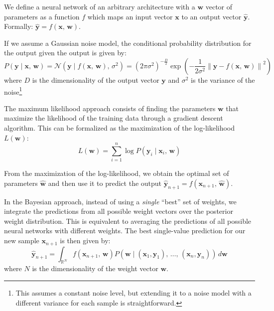 We define a neural network of an arbitrary architecture with a $\textbf{w}$ vector of parameters as a function
$f$ which maps an input vector $\textbf{x}$ to an output vector $\widehat{\textbf{y}}$. Formally: $\widehat{\textbf{y}} = f(\textbf{x},\,\textbf{w})$.

If we assume a Gaussian noise model, the conditional probability distribution for the output given the output is given by:
\begin{equation}
    P(\textbf{y} \mid \textbf{x},\,\textbf{w}) = \mathcal{N}(\textbf{y} \mid f(\textbf{x},\,\textbf{w}),\,\sigma^2)
    = \left(2\pi\sigma^2\right)^{-\frac{D}{2}} \exp \left( -\frac{1}{2\sigma^2} \left\lVert \textbf{y} - f(\textbf{x},\,\textbf{w}) \right\rVert^2 \right)
\end{equation}
where $D$ is the dimensionality of the output vector $\textbf{y}$ and $\sigma^2$ is the variance of the noise\footnote{
    This assumes a constant noise level, but extending it to a noise model with a different variance for each sample is straightforward.
}

The maximum likelihood approach consists of finding the parameters $\textbf{w}$ that maximize the likelihood of the training data
through a gradient descent algorithm. This can be formalized as the maximization of the log-likelihood $L(\textbf{w})$:
\begin{equation}%
    \label{eq:log_likelihood}
    L(\textbf{w}) = \sum_{i=1}^{n} \log P(\textbf{y}_i \mid \textbf{x}_i,\,\textbf{w})
\end{equation}

From the maximization of the log-likelihood, we obtain the optimal set of parameters $\widehat{\textbf{w}}$ and then use it
to predict the output $\widehat{\textbf{y}}_{n+1} = f(\textbf{x}_{n+1},\,\widehat{\textbf{w}})$.

In the Bayesian approach, instead of using a \emph{single} ``best'' set of weights, we integrate the predictions from all possible
weight vectors over the posterior weight distribution. This is equivalent to averaging the predictions of all possible neural networks
with different weights. The best single-value prediction for our new sample $\textbf{x}_{n+1}$ is then given by:
\begin{equation}\label{eq:bnn_single_prediction}
    \widehat{\textbf{y}}_{n+1} = \int_{\mathds{R}^N}
        f(\textbf{x}_{n+1},\,\textbf{w})
        P(\textbf{w} \mid \left(\textbf{x}_1,  \textbf{y}_1 \right),\,\dots,\,\left(\textbf{x}_n,  \textbf{y}_n \right))
        \,d\textbf{w}
\end{equation}
where $N$ is the dimensionality of the weight vector $\textbf{w}$.

